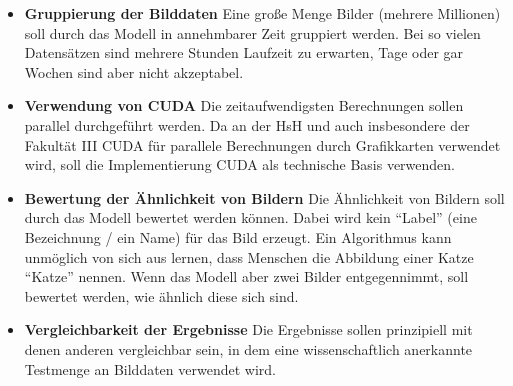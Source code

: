 \begin{itemize}
	\item \textbf{Gruppierung der Bilddaten} Eine große Menge Bilder (mehrere Millionen) soll durch das Modell in annehmbarer Zeit gruppiert werden. Bei so vielen Datensätzen sind mehrere Stunden Laufzeit zu erwarten, Tage oder gar Wochen sind aber nicht akzeptabel. 
	\item \textbf{Verwendung von CUDA} Die zeitaufwendigsten Berechnungen sollen parallel durchgeführt werden. Da an der HsH und auch insbesondere der Fakultät III CUDA für parallele Berechnungen durch Grafikkarten verwendet wird, soll die Implementierung CUDA als technische Basis verwenden.
	\item \textbf{Bewertung der Ähnlichkeit von Bildern} Die Ähnlichkeit von Bildern soll durch das Modell bewertet werden können. Dabei wird kein \enquote{Label} (eine Bezeichnung / ein Name) für das Bild erzeugt. Ein Algorithmus kann unmöglich von sich aus lernen, dass Menschen die Abbildung einer Katze \enquote{Katze} nennen. Wenn das Modell aber zwei Bilder entgegennimmt, soll bewertet werden, wie ähnlich diese sich sind.
	\item \textbf{Vergleichbarkeit der Ergebnisse} Die Ergebnisse sollen prinzipiell mit denen anderen vergleichbar sein, in dem eine wissenschaftlich anerkannte Testmenge an Bilddaten verwendet wird.
\end{itemize}
